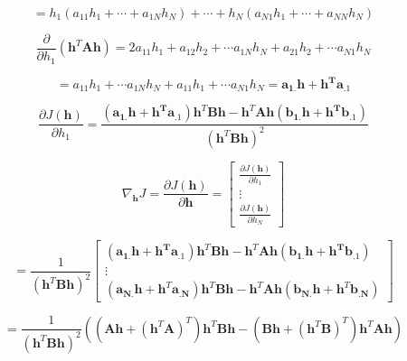 \documentclass[fleqn]{article}
\begin{document}
\begin{enumerate}
		\begin{equation*}
			= h_1(a_{11}h_1 + \cdots + a_{1N}h_N) + \cdots + h_N( a_{N1}h_1 + \cdots + a_{NN}h_N)
		\end{equation*}
		
		\begin{equation*}
			\frac{\partial}{\partial{h_1}}\left(\mathbf{h}^T\mathbf{A}\mathbf{h}\right) = 2a_{11}h_1 + a_{12}h_2 + \cdots a_{1N}h_N + a_{21}h_2 + \cdots a_{N1}h_N
		\end{equation*}
		
		\begin{equation*}
			= a_{11}h_1 + \cdots a_{1N}h_N + a_{11}h_1 + \cdots a_{N1}h_N = \mathbf{a_{1.}h} + \mathbf{h^Ta_{.1}}
		\end{equation*}
		
		\begin{equation*}
			\frac{\partial{J(\mathbf{h})}}{\partial{h_1}} = \frac{(\mathbf{a_{1.}h} + \mathbf{h^Ta_{.1}})\mathbf{h}^T\mathbf{B}\mathbf{h} - \mathbf{h}^T\mathbf{A}\mathbf{h}(\mathbf{b_{1.}h} + \mathbf{h^Tb_{.1}})}{(\mathbf{h}^T\mathbf{B}\mathbf{h})^2}
		\end{equation*}
		
		\begin{equation*}
			\nabla_{\mathbf{h}}{J} = \frac{\partial{J(\mathbf{h})}}{\partial\mathbf{h}} = \begin{bmatrix}
				\frac{\partial{J(\mathbf{h})}}{\partial{h_1}} \\
				\vdots \\
				\frac{\partial{J(\mathbf{h})}}{\partial{h_N}}
			\end{bmatrix}
		\end{equation*}
		
		\begin{equation*}
			 = \frac{1}{(\mathbf{h}^T\mathbf{B}\mathbf{h})^2}\begin{bmatrix}
				(\mathbf{a_{1.}h} + \mathbf{h^Ta_{.1}})\mathbf{h}^T\mathbf{B}\mathbf{h} - \mathbf{h}^T\mathbf{A}\mathbf{h}(\mathbf{b_{1.}h} + \mathbf{h^Tb_{.1}}) \\
				\vdots \\
				(\mathbf{a_{N.}h} + \mathbf{h}^T\mathbf{a_{.N}})\mathbf{h}^T\mathbf{B}\mathbf{h} - \mathbf{h}^T\mathbf{A}\mathbf{h}(\mathbf{b_{N.}h} + \mathbf{h}^T\mathbf{b_{.N}})
			\end{bmatrix}
		\end{equation*}
		
		\begin{equation*}
			 = \frac{1}{(\mathbf{h}^T\mathbf{B}\mathbf{h})^2}\left(\left(\mathbf{Ah} + \left(\mathbf{h}^T\mathbf{A}\right)^T\right)\mathbf{h}^T\mathbf{B}\mathbf{h} - \left(\mathbf{Bh} + \left(\mathbf{h}^T\mathbf{B}\right)^T\right)\mathbf{h}^T\mathbf{A}\mathbf{h}\right)
		\end{equation*}
		

\end{enumerate}
\end{document}
